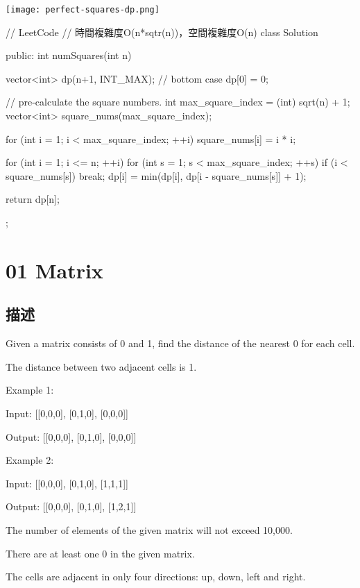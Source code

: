 \begin{center}
\texttt{[image: perfect-squares-dp.png]}\\
\label{fig:perfect-squares-dp}
\end{center}

\begin{Code}
// LeetCode
// 時間複雜度O(n*sqtr(n))，空間複雜度O(n)
class Solution {
public:
    int numSquares(int n) {
        vector<int> dp(n+1, INT_MAX);
        // bottom case
        dp[0] = 0;

        // pre-calculate the square numbers.
        int max_square_index = (int) sqrt(n) + 1;
        vector<int> square_nums(max_square_index);

        for (int i = 1; i < max_square_index; ++i) {
            square_nums[i] = i * i;
        }

        for (int i = 1; i <= n; ++i) {
            for (int s = 1; s < max_square_index; ++s) {
                if (i < square_nums[s])
                    break;
                dp[i] = min(dp[i], dp[i - square_nums[s]] + 1);
            }
        }

        return dp[n];
    }
};
\end{Code}

\section{01 Matrix}
\label{sec:01-matrix}

\subsection{描述}
Given a matrix consists of 0 and 1, find the distance of the nearest 0 for each cell.

The distance between two adjacent cells is 1.

Example 1:
\begin{Code}
Input:
[[0,0,0],
 [0,1,0],
 [0,0,0]]

Output:
[[0,0,0],
 [0,1,0],
 [0,0,0]]
\end{Code}

Example 2:
\begin{Code}
Input:
[[0,0,0],
 [0,1,0],
 [1,1,1]]

Output:
[[0,0,0],
 [0,1,0],
 [1,2,1]]
\end{Code}


\begindot
\item The number of elements of the given matrix will not exceed 10,000.
\item There are at least one 0 in the given matrix.
\item The cells are adjacent in only four directions: up, down, left and right.
\myenddot

